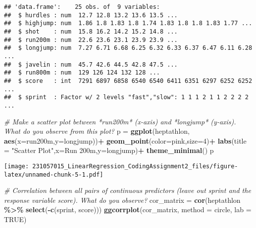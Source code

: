 \documentclass[
]{article}
\newenvironment{Shaded}{\begin{snugshade}}{\end{snugshade}}
\newcommand{\AttributeTok}[1]{\textcolor[rgb]{0.13,0.29,0.53}{#1}}
\newcommand{\CommentTok}[1]{\textcolor[rgb]{0.56,0.35,0.01}{\textit{#1}}}
\newcommand{\ConstantTok}[1]{\textcolor[rgb]{0.56,0.35,0.01}{#1}}
\newcommand{\DecValTok}[1]{\textcolor[rgb]{0.00,0.00,0.81}{#1}}
\newcommand{\FunctionTok}[1]{\textcolor[rgb]{0.13,0.29,0.53}{\textbf{#1}}}
\newcommand{\NormalTok}[1]{#1}
\newcommand{\OtherTok}[1]{\textcolor[rgb]{0.56,0.35,0.01}{#1}}
\newcommand{\SpecialCharTok}[1]{\textcolor[rgb]{0.81,0.36,0.00}{\textbf{#1}}}
\newcommand{\StringTok}[1]{\textcolor[rgb]{0.31,0.60,0.02}{#1}}
\begin{document}
\begin{verbatim}
## 'data.frame':    25 obs. of  9 variables:
##  $ hurdles : num  12.7 12.8 13.2 13.6 13.5 ...
##  $ highjump: num  1.86 1.8 1.83 1.8 1.74 1.83 1.8 1.8 1.83 1.77 ...
##  $ shot    : num  15.8 16.2 14.2 15.2 14.8 ...
##  $ run200m : num  22.6 23.6 23.1 23.9 23.9 ...
##  $ longjump: num  7.27 6.71 6.68 6.25 6.32 6.33 6.37 6.47 6.11 6.28 ...
##  $ javelin : num  45.7 42.6 44.5 42.8 47.5 ...
##  $ run800m : num  129 126 124 132 128 ...
##  $ score   : int  7291 6897 6858 6540 6540 6411 6351 6297 6252 6252 ...
##  $ sprint  : Factor w/ 2 levels "fast","slow": 1 1 1 2 1 1 2 2 2 2 ...
\end{verbatim}

\begin{Shaded}
\begin{Highlighting}[]
\CommentTok{\# Make a scatter plot between *run200m* (x{-}axis) and *longjump* (y{-}axis). What do you observe from this plot?}
\NormalTok{p }\OtherTok{=} \FunctionTok{ggplot}\NormalTok{(heptathlon, }\FunctionTok{aes}\NormalTok{(}\AttributeTok{x=}\NormalTok{run200m,}\AttributeTok{y=}\NormalTok{longjump))}\SpecialCharTok{+}
  \FunctionTok{geom\_point}\NormalTok{(}\AttributeTok{color=}\StringTok{\textquotesingle{}pink\textquotesingle{}}\NormalTok{,}\AttributeTok{size=}\DecValTok{4}\NormalTok{)}\SpecialCharTok{+}  \FunctionTok{labs}\NormalTok{(}\AttributeTok{title =} \StringTok{"Scatter Plot"}\NormalTok{,}\AttributeTok{x=}\StringTok{\textquotesingle{}Run 200m\textquotesingle{}}\NormalTok{,}\AttributeTok{y=}\StringTok{\textquotesingle{}longjump\textquotesingle{}}\NormalTok{)}\SpecialCharTok{+} 
  \FunctionTok{theme\_minimal}\NormalTok{()}
\NormalTok{p}
\end{Highlighting}
\end{Shaded}

\texttt{[image: 231057015\_LinearRegression\_CodingAssignment2\_files/figure-latex/unnamed-chunk-5-1.pdf]}

\begin{Shaded}
\begin{Highlighting}[]
\CommentTok{\# Correlation between all pairs of continuous predictors (leave out sprint and the response variable score). What do you observe?}
\NormalTok{cor\_matrix }\OtherTok{=} \FunctionTok{cor}\NormalTok{(heptathlon }\SpecialCharTok{\%\textgreater{}\%} \FunctionTok{select}\NormalTok{(}\SpecialCharTok{{-}}\FunctionTok{c}\NormalTok{(sprint, score)))}
\FunctionTok{ggcorrplot}\NormalTok{(cor\_matrix, }\AttributeTok{method =} \StringTok{\textquotesingle{}circle\textquotesingle{}}\NormalTok{, }\AttributeTok{lab =} \ConstantTok{TRUE}\NormalTok{)}
\end{Highlighting}
\end{Shaded}
\end{document}
